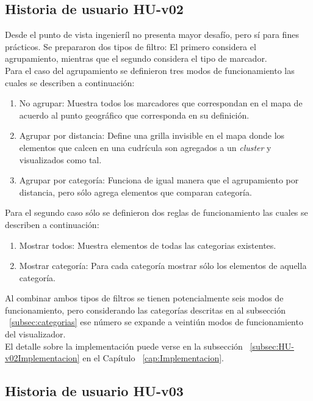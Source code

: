 \subsection{Historia de usuario HU-v02}
\label{subsec:HU-v02}

Desde el punto de vista ingenieríl no presenta mayor desafío, pero sí para fines prácticos. Se prepararon dos tipos de filtro: El primero considera el agrupamiento, mientras que el segundo considera el tipo de marcador.\\

Para el caso del agrupamiento se definieron tres modos de funcionamiento las cuales se describen a continuación:

\begin{enumerate}
\item No agrupar: Muestra todos los marcadores que correspondan en el mapa de acuerdo al punto geográfico que corresponda en su definición.
\item Agrupar por distancia: Define una grilla invisible en el mapa donde los elementos que calcen en una cudrícula son agregados a un \textit{cluster} y visualizados como tal.
\item Agrupar por categoría: Funciona de igual manera que el agrupamiento por distancia, pero sólo agrega elementos que comparan categoría.
\end{enumerate}

Para el segundo caso sólo se definieron dos reglas de funcionamiento las cuales se describen a continuación:

\begin{enumerate}
\item Mostrar todos: Muestra elementos de todas las categorias existentes.
\item Mostrar categoría: Para cada categoría mostrar sólo los elementos de aquella categoría. 
\end{enumerate}

Al combinar ambos tipos de filtros se tienen potencialmente seis modos de funcionamiento, pero considerando las categorías descritas en al subsección ~\ref{subsec:categorias} ese número se expande a veintiún modos de funcionamiento del visualizador.\\

El detalle sobre la implementación puede verse en la subsección ~\ref{subsec:HU-v02Implementacion} en el Capítulo ~\ref{cap:Implementacion}.\\

\subsection{Historia de usuario HU-v03}
\label{subsec:HU-v03}

